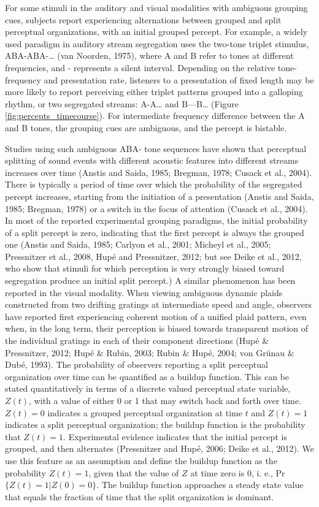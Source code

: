 For some stimuli in the auditory and visual modalities with ambiguous grouping cues, subjects report experiencing alternations between grouped and split perceptual organizations, with an initial grouped percept. For example, a widely used paradigm in auditory stream segregation uses the two-tone triplet stimulus, ABA-ABA-… (van Noorden, 1975), where A and B refer to tones at different frequencies, and - represents a silent interval. Depending on the relative tone-frequency and presentation rate, listeners to a presentation of fixed length may be more likely to report perceiving either triplet patterns grouped into a galloping rhythm, or two segregated streams: A-A… and B---B… (Figure \ref{fig:percepts_timecourse}). For intermediate frequency difference between the A and B tones, the grouping cues are ambiguous, and the percept is bistable.

Studies using such ambiguous ABA- tone sequences have shown that perceptual splitting of sound events with different acoustic features into different streams increases over time (Anstis and Saida, 1985; Bregman, 1978; Cusack et al., 2004). There is typically a period of time over which the probability of the segregated percept increases, starting from the initiation of a presentation (Anstis and Saida, 1985; Bregman, 1978) or a switch in the focus of attention (Cusack et al., 2004). In most of the reported experimental grouping paradigms, the initial probability of a split percept is zero, indicating that the first percept is always the grouped one (Anstis and Saida, 1985; Carlyon et al., 2001; Micheyl et al., 2005; Pressnitzer et al., 2008, Hupé and Pressnitzer, 2012; but see Deike et al., 2012, who show that stimuli for which perception is very strongly biased toward segregation produce an initial split percept.) A similar phenomenon has been reported in the visual modality. When viewing ambiguous dynamic plaids constructed from two drifting gratings at intermediate speed and angle, observers have reported first experiencing coherent motion of a unified plaid pattern, even when, in the long term, their perception is biased towards transparent motion of the individual gratings in each of their component directions (Hupé \& Pressnitzer, 2012; Hupé \& Rubin, 2003; Rubin \& Hupé, 2004; von Grünau \& Dubé, 1993). The probability of observers reporting a split perceptual organization over time can be quantified as a buildup function. This can be stated quantitatively in terms of a discrete valued perceptual state variable, $Z(t)$, with a value of either 0 or 1 that may switch back and forth over time. $Z(t) = 0$ indicates a grouped perceptual organization at time $t$ and $Z(t) = 1$ indicates a split perceptual organization; the buildup function is the probability that $Z(t) = 1$. Experimental evidence indicates that the initial percept is grouped, and then alternates (Pressnitzer and Hupé, 2006; Deike et al., 2012). We use this feature as an assumption and define the buildup function as the probability $Z(t) = 1$, given that the value of $Z$ at time zero is 0, i. e., Pr$\{Z(t) = 1 | Z(0) = 0\}$. The buildup function approaches a steady state value that equals the fraction of time that the split organization is dominant.

